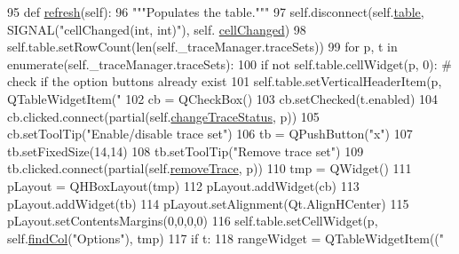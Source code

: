 \begin{DoxyCode}
95     \textcolor{keyword}{def }\hyperlink{classsoftware_1_1chipwhisperer_1_1common_1_1ui_1_1TraceManagerDialog_1_1TraceManagerDialog_a5424cb507c1ef3b88ea8968a7852b05e}{refresh}(self):
96         \textcolor{stringliteral}{"""Populates the table."""}
97         self.disconnect(self.\hyperlink{classsoftware_1_1chipwhisperer_1_1common_1_1ui_1_1TraceManagerDialog_1_1TraceManagerDialog_afcdeac0abef4cfc5f074d2e497c66b27}{table}, SIGNAL(\textcolor{stringliteral}{"cellChanged(int, int)"}), self.
      \hyperlink{classsoftware_1_1chipwhisperer_1_1common_1_1ui_1_1TraceManagerDialog_1_1TraceManagerDialog_a182799ebe9a0160d0e63733dafd6501d}{cellChanged})
98         self.table.setRowCount(len(self.\_traceManager.traceSets))
99         \textcolor{keywordflow}{for} p, t \textcolor{keywordflow}{in} enumerate(self.\_traceManager.traceSets):
100             \textcolor{keywordflow}{if} \textcolor{keywordflow}{not} self.table.cellWidget(p, 0): \textcolor{comment}{# check if the option buttons already exist}
101                 self.table.setVerticalHeaderItem(p, QTableWidgetItem(\textcolor{stringliteral}{"%
102                 cb = QCheckBox()
103                 cb.setChecked(t.enabled)
104                 cb.clicked.connect(partial(self.\hyperlink{classsoftware_1_1chipwhisperer_1_1common_1_1ui_1_1TraceManagerDialog_1_1TraceManagerDialog_a36d07b45f6515fd18b227c57fb678288}{changeTraceStatus}, p))
105                 cb.setToolTip(\textcolor{stringliteral}{"Enable/disable trace set"})
106                 tb = QPushButton(\textcolor{stringliteral}{"x"})
107                 tb.setFixedSize(14,14)
108                 tb.setToolTip(\textcolor{stringliteral}{"Remove trace set"})
109                 tb.clicked.connect(partial(self.\hyperlink{classsoftware_1_1chipwhisperer_1_1common_1_1ui_1_1TraceManagerDialog_1_1TraceManagerDialog_a0cf04acde65e64cfa3fb8a0a0ed28e92}{removeTrace}, p))
110                 tmp = QWidget()
111                 pLayout = QHBoxLayout(tmp)
112                 pLayout.addWidget(cb)
113                 pLayout.addWidget(tb)
114                 pLayout.setAlignment(Qt.AlignHCenter)
115                 pLayout.setContentsMargins(0,0,0,0)
116                 self.table.setCellWidget(p, self.\hyperlink{classsoftware_1_1chipwhisperer_1_1common_1_1ui_1_1TraceManagerDialog_1_1TraceManagerDialog_a6169d8f4a68f0aa7aae52ee89be25b54}{findCol}(\textcolor{stringliteral}{"Options"}), tmp)
117             \textcolor{keywordflow}{if} t:
118                 rangeWidget = QTableWidgetItem((\textcolor{stringliteral}{"%
}}
\end{DoxyCode}
